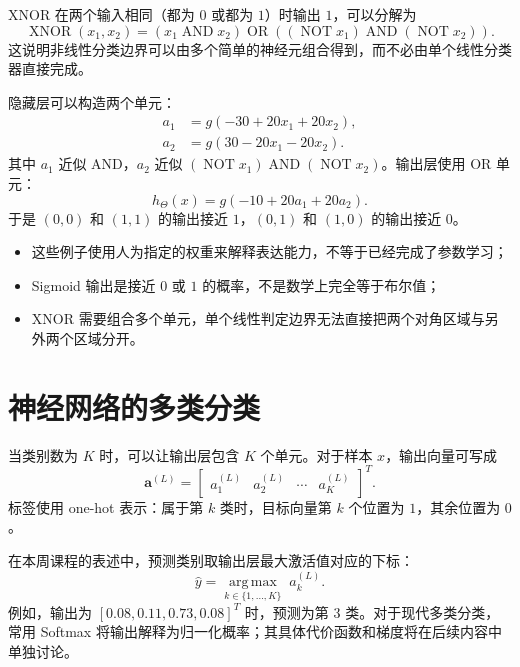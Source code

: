 \documentclass[12pt,a4paper]{ctexart}
\begin{document}
\begin{definitionbox}
XNOR 在两个输入相同（都为 $0$ 或都为 $1$）时输出 $1$，可以分解为
\[
  \operatorname{XNOR}(x_1,x_2)
  =(x_1\operatorname{AND}x_2)
  \operatorname{OR}
  ((\operatorname{NOT}x_1)\operatorname{AND}(\operatorname{NOT}x_2)).
\]
这说明非线性分类边界可以由多个简单的神经元组合得到，而不必由单个线性分类器直接完成。
\end{definitionbox}

\begin{examplebox}
隐藏层可以构造两个单元：
\begin{align*}
  a_1&=g(-30+20x_1+20x_2),\\
  a_2&=g(30-20x_1-20x_2).
\end{align*}
其中 $a_1$ 近似 AND，$a_2$ 近似 $(\operatorname{NOT}x_1)\operatorname{AND}(\operatorname{NOT}x_2)$。输出层使用 OR 单元：
\[
  h_{\Theta}(x)=g(-10+20a_1+20a_2).
\]
于是 $(0,0)$ 和 $(1,1)$ 的输出接近 $1$，$(0,1)$ 和 $(1,0)$ 的输出接近 $0$。
\end{examplebox}

\begin{mistakebox}[逻辑运算例子的边界]
\begin{itemize}
  \item 这些例子使用人为指定的权重来解释表达能力，不等于已经完成了参数学习；
  \item Sigmoid 输出是接近 $0$ 或 $1$ 的概率，不是数学上完全等于布尔值；
  \item XNOR 需要组合多个单元，单个线性判定边界无法直接把两个对角区域与另外两个区域分开。
\end{itemize}
\end{mistakebox}

\section{神经网络的多类分类}

\begin{definitionbox}[多输出单元]
当类别数为 $K$ 时，可以让输出层包含 $K$ 个单元。对于样本 $x$，输出向量可写成
\[
  \mathbf{a}^{(L)}=
  \begin{bmatrix}a_1^{(L)}&a_2^{(L)}&\cdots&a_K^{(L)}\end{bmatrix}^{T}.
\]
标签使用 one-hot 表示：属于第 $k$ 类时，目标向量第 $k$ 个位置为 $1$，其余位置为 $0$。
\end{definitionbox}

\begin{keybox}[从输出向量得到类别]
在本周课程的表述中，预测类别取输出层最大激活值对应的下标：
\[
  \hat y=\underset{k\in\{1,\ldots,K\}}{\operatorname{arg\,max}}\;a_k^{(L)}.
\]
例如，输出为 $[0.08,0.11,0.73,0.08]^T$ 时，预测为第 $3$ 类。对于现代多类分类，常用 Softmax 将输出解释为归一化概率；其具体代价函数和梯度将在后续内容中单独讨论。
\end{keybox}
\end{document}
